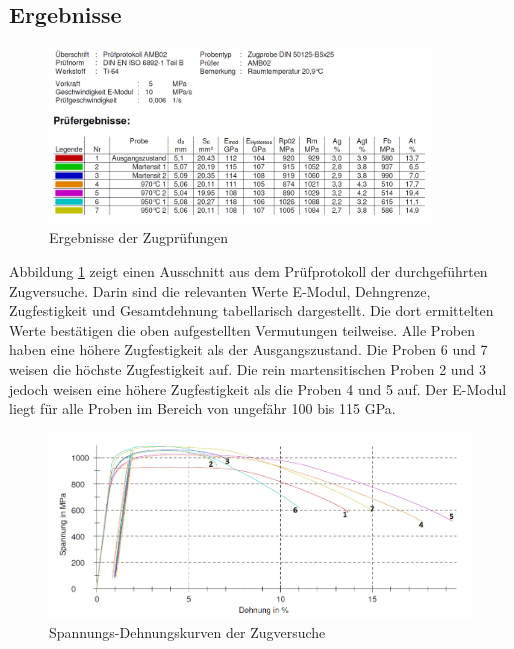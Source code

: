 \documentclass[a4paper, 11pt]{tubsreprt}
\begin{document}
\subsection*{Ergebnisse}

\begin{figure}
\centering
\includegraphics[width=0.9\textwidth]{Bilder/Zugpruefungergebnisse.png}
\caption{Ergebnisse der Zugprüfungen}
\label{Ergebnisse der Zugpruefungen}
\end{figure}

Abbildung \ref{Ergebnisse der Zugpruefungen} zeigt einen Ausschnitt aus dem Prüfprotokoll der durchgeführten Zugversuche. Darin sind die relevanten Werte E-Modul, Dehngrenze, Zugfestigkeit und Gesamtdehnung tabellarisch dargestellt. Die dort ermittelten Werte bestätigen die oben aufgestellten Vermutungen teilweise. Alle Proben haben eine höhere Zugfestigkeit als der Ausgangszustand. Die Proben 6 und 7 weisen die höchste Zugfestigkeit auf. Die rein martensitischen Proben 2 und 3 jedoch weisen eine höhere Zugfestigkeit als die Proben 4 und 5 auf. Der E-Modul liegt für alle Proben im Bereich von ungefähr 100 bis 115 GPa.

\begin{figure}
\centering
\includegraphics[angle=90, height=0.9\textheight]{Bilder/Zugpruefverluaufe.png}
\caption{Spannungs-Dehnungskurven der Zugversuche}
\label{Spannungs Dehnungskurven}
\end{figure}
\end{document}
